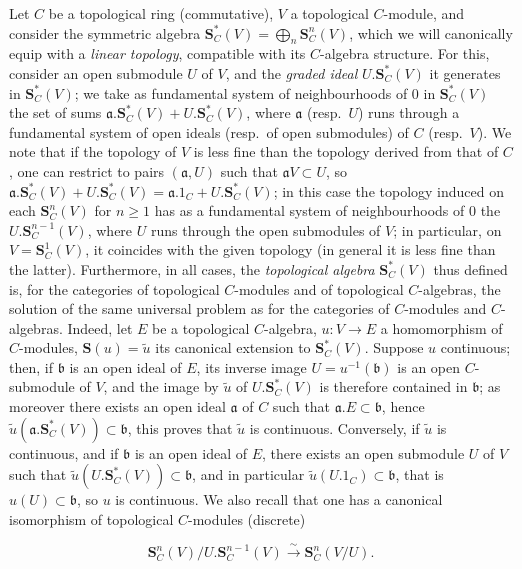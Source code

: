 \begin{env}[19.5.1]
\label{0.19.5.1}
Let $C$ be a topological ring (commutative), $V$ a topological $C$-module, and consider the symmetric algebra $\mathbf{S}_C^*(V)=\bigoplus_n\mathbf{S}_C^n(V)$, which we will canonically equip with a \emph{linear topology}, compatible with its $C$-algebra structure.
For this, consider an open submodule $U$ of $V$, and the \emph{graded ideal} $U.\mathbf{S}_C^*(V)$ it generates in $\mathbf{S}_C^*(V)$;
we take as fundamental system of neighbourhoods of $0$ in $\mathbf{S}_C^*(V)$ the set of sums $\mathfrak{a}.\mathbf{S}_C^*(V)+U.\mathbf{S}_C^*(V)$, where $\mathfrak{a}$ (resp.\ $U$) runs through a fundamental system of open ideals (resp.\ of open submodules) of $C$ (resp.\ $V$).
We note that if the topology of $V$ is less fine than the topology derived from that of $C$, one can restrict to pairs $(\mathfrak{a},U)$ such that $\mathfrak{a}V\subset U$, so $\mathfrak{a}.\mathbf{S}_C^*(V)+U.\mathbf{S}_C^*(V)=\mathfrak{a}.1_C+U.\mathbf{S}_C^*(V)$;
in this case the topology induced on each $\mathbf{S}_C^n(V)$ for $n\geq 1$ has as a fundamental system of neighbourhoods of $0$ the $U.\mathbf{S}_C^{n-1}(V)$, where $U$ runs through the open submodules of $V$;
in particular, on $V=\mathbf{S}_C^1(V)$, it coincides with the given topology (in general it is less fine than the latter).
Furthermore, in all cases, the \emph{topological algebra} $\mathbf{S}_C^*(V)$ thus defined is, for the categories of topological $C$-modules and of topological $C$-algebras, the solution of the same universal problem as for the categories of $C$-modules and $C$-algebras.
Indeed, let $E$ be a topological $C$-algebra, $u:V\to E$ a homomorphism of $C$-modules, $\mathbf{S}(u)=\widetilde{u}$ its canonical extension to $\mathbf{S}_C^*(V)$.
Suppose $u$ continuous; then, if $\mathfrak{b}$ is an open ideal of $E$, its inverse image $U=u^{-1}(\mathfrak{b})$ is an open $C$-submodule of $V$, and the image by $\widetilde{u}$ of $U.\mathbf{S}_C^*(V)$ is therefore contained in $\mathfrak{b}$;
as moreover there exists an open ideal $\mathfrak{a}$ of $C$ such that $\mathfrak{a}.E\subset\mathfrak{b}$, hence $\widetilde{u}(\mathfrak{a}.\mathbf{S}_C^*(V))\subset\mathfrak{b}$, this proves that $\widetilde{u}$ is continuous.
Conversely, if $\widetilde{u}$ is continuous, and if $\mathfrak{b}$ is an open ideal of $E$, there exists an open submodule $U$ of $V$ such that $\widetilde{u}(U.\mathbf{S}_C^*(V))\subset\mathfrak{b}$, and in particular $\widetilde{u}(U.1_C)\subset\mathfrak{b}$, that is $u(U)\subset\mathfrak{b}$, so $u$ is continuous.
We also recall that one has a canonical isomorphism of topological $C$-modules (discrete)

\[
\mathbf{S}_C^n(V)/U.\mathbf{S}_C^{n-1}(V) \xrightarrow{\sim} \mathbf{S}_C^n(V/U). \tag{19.5.1.1}
\]

\label{0.19.5.1.1}
\end{env}

